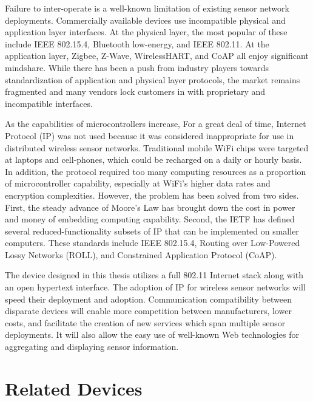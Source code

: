 Failure to inter-operate is a well-known limitation of existing sensor network deployments. Commercially available devices use incompatible physical and application layer interfaces. At the physical layer, the most popular of these include IEEE 802.15.4, Bluetooth low-energy, and IEEE 802.11. At the application layer, Zigbee, Z-Wave, WirelessHART, and CoAP all enjoy significant mindshare. While there has been a push from industry players towards standardization of application and physical layer protocols, the market remains fragmented and many vendors lock customers in with proprietary and incompatible interfaces.

As the capabilities of microcontrollers increase, For a great deal of time, Internet Protocol (IP) was not used because it was considered inappropriate for use in distributed wireless sensor networks. Traditional mobile WiFi chips were targeted at laptops and cell-phones, which could be recharged on a daily or hourly basis. In addition, the protocol required too many computing resources as a proportion of microcontroller capability, especially at WiFi's higher data rates and encryption complexities. However, the problem has been solved from two sides. First, the steady advance of Moore's Law has brought down the cost in power and money of embedding computing capability. Second, the IETF has defined several reduced-functionality subsets of IP that can be implemented on smaller computers. These standards include IEEE 802.15.4, Routing over Low-Powered Lossy Networks (ROLL), and Constrained Application Protocol (CoAP). 

The device designed in this thesis utilizes a full 802.11 Internet stack along with an open hypertext interface. The adoption of IP for wireless sensor networks will speed their deployment and adoption. Communication compatibility between disparate devices will enable more competition between manufacturers, lower costs, and facilitate the creation of new services which span multiple sensor deployments. It will also allow the easy use of well-known Web technologies for aggregating and displaying sensor information.

\section{Related Devices}

